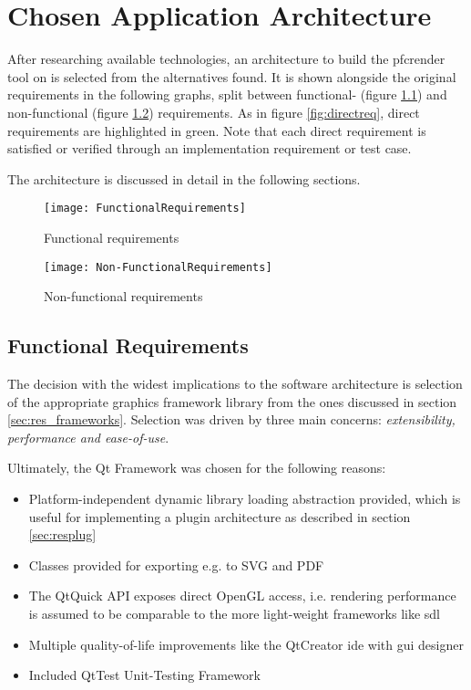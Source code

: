 \chapter{Chosen Application Architecture}
After researching available technologies, an architecture to build the pfcrender tool on is selected from the alternatives found. It is shown alongside the original requirements in the following graphs, split between functional- (figure \ref{fr}) and non-functional (figure \ref{nfr}) requirements. As in figure \ref{fig:directreq}, direct requirements are highlighted in green. Note that each direct requirement is satisfied or verified through an implementation requirement or test case.

The architecture is discussed in detail in the following sections.

\begin{figure}[p]
	\texttt{[image: FunctionalRequirements]}
	\caption{Functional requirements}
	\label{fr}
\end{figure}

\begin{figure}[p]
	\texttt{[image: Non-FunctionalRequirements]}
	\caption{Non-functional requirements}
	\label{nfr}
\end{figure}

\section{Functional Requirements}
The decision with the widest implications to the software architecture is selection of the appropriate graphics framework library from the ones discussed in section \ref{sec:res_frameworks}.
Selection was driven by three main concerns: \emph{extensibility, performance and ease-of-use}.

Ultimately, the Qt Framework was chosen for the following reasons:
\begin{itemize}
	\item Platform-independent dynamic library loading abstraction provided, which is useful for implementing a plugin architecture as described in section \ref{sec:resplug}
	\item Classes provided for exporting e.g. to SVG and PDF
	\item The QtQuick API exposes direct OpenGL access, i.e. rendering performance is assumed to be comparable to the more light-weight frameworks like \gls{sdl}
	\item Multiple quality-of-life improvements like the QtCreator \gls{ide} with \gls{gui} designer
	\item Included QtTest Unit-Testing Framework
\end{itemize}

